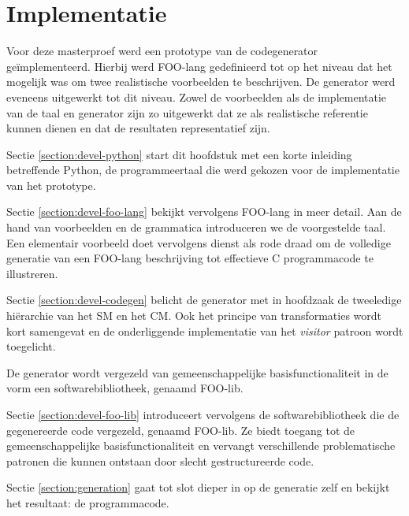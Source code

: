 
\chapter{Implementatie}
\label{chapter:implementatie}

Voor deze masterproef werd een prototype van de codegenerator
ge\"implementeerd. Hierbij werd FOO-lang gedefinieerd tot op het niveau dat het
mogelijk was om twee realistische voorbeelden te beschrijven. De generator werd
eveneens uitgewerkt tot dit niveau. Zowel de voorbeelden als de implementatie
van de taal en generator zijn zo uitgewerkt dat ze als realistische referentie
kunnen dienen en dat de resultaten representatief zijn.

Sectie \ref{section:devel-python} start dit hoofdstuk met een korte inleiding
betreffende Python, de programmeertaal die werd gekozen voor de implementatie
van het prototype.

Sectie \ref{section:devel-foo-lang} bekijkt vervolgens FOO-lang in meer detail.
Aan de hand van voorbeelden en de grammatica introduceren we de voorgestelde
taal. Een elementair voorbeeld doet vervolgens dienst als rode draad om de
volledige generatie van een FOO-lang beschrijving tot effectieve C
programmacode te illustreren.

Sectie \ref{section:devel-codegen} belicht de generator met in hoofdzaak de
tweeledige hi\"erarchie van het SM en het CM. Ook het principe van
transformaties wordt kort samengevat en de onderliggende implementatie van het
\emph{visitor} patroon \citep{gamma1994design} wordt toegelicht.

De generator wordt vergezeld van gemeenschappelijke basisfunctionaliteit in de
vorm een softwarebibliotheek, genaamd FOO-lib.

Sectie \ref{section:devel-foo-lib} introduceert vervolgens de
softwarebibliotheek die de gegenereerde code vergezeld, genaamd FOO-lib. Ze
biedt toegang tot de gemeenschappelijke basisfunctionaliteit en vervangt
verschillende problematische patronen die kunnen ontstaan door slecht
gestructureerde code.

Sectie \ref{section:generation} gaat tot slot dieper in op de generatie zelf en
bekijkt het resultaat: de programmacode. 






